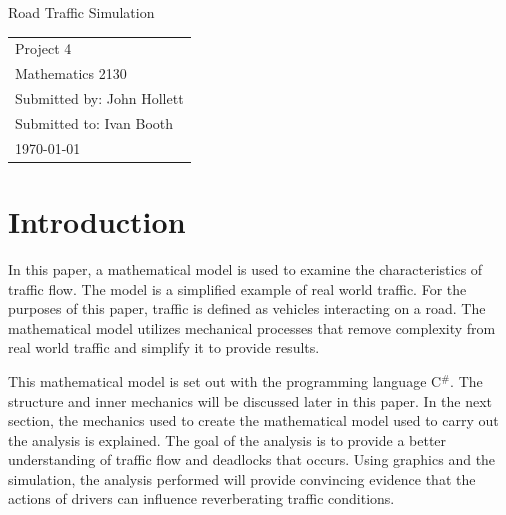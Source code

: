 \documentclass[12pt]{extarticle}
\begin{document}
\begin{titlepage}
\vspace*{2in}
\begin{center}
{\LARGE Road Traffic Simulation}
\end{center}

\vspace{2cm}


\vspace{3in}
\begin{flushright}
\begin{tabular}{l}
Project 4 \\
Mathematics 2130\\
Submitted by: John Hollett\\
Submitted to: Ivan Booth\\
\today
\end{tabular}
\end{flushright}


\end{titlepage}


\rfoot{\thepage}





\section{Introduction}

In this paper, a mathematical model is used to examine the characteristics of traffic flow. The model is a simplified example of real world traffic. For the purposes of this paper, traffic is defined as vehicles interacting on a road. The mathematical model utilizes mechanical processes that remove complexity from real world traffic and simplify it to provide results.

This mathematical model is set out with the programming language C$^\#$. The structure and inner mechanics will be discussed later in this paper. In the next section, the mechanics used to create the mathematical model used to carry out the analysis is explained. The goal of the analysis is to provide a better understanding of traffic flow and deadlocks that occurs. Using graphics and the simulation, the analysis performed will provide convincing evidence that the actions of drivers can influence reverberating traffic conditions.
\end{document}

